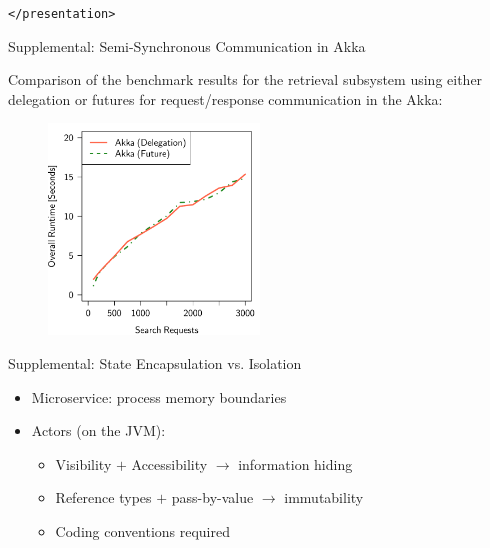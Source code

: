 \documentclass{beamer}
\begin{document}

\begin{frame}{}

\vspace{1cm}
\begin{center}
  \texttt{</presentation>}
\end{center}

\end{frame}


\begin{frame}{Supplemental: Semi-Synchronous Communication in Akka}

Comparison of the benchmark results for the retrieval subsystem using either delegation or futures for request/response communication in the Akka:

\begin{center}
  \begin{figure} 
    \includegraphics[width=0.5\textwidth]{graphics/eval-search-comparison-akka-delegation-future.pdf} 
  \end{figure}
\end{center}

\end{frame}


\begin{frame}{Supplemental: State Encapsulation vs. Isolation}

\begin{itemize}
  \item Microservice: process memory boundaries
  \item Actors (on the JVM):
  \begin{itemize}
    \item Visibility $+$ Accessibility $\rightarrow$ information hiding
    \item Reference types $+$ pass-by-value $\rightarrow$ immutability
    \item Coding conventions required
  \end{itemize}
\end{itemize}

\end{frame}

\end{document}
